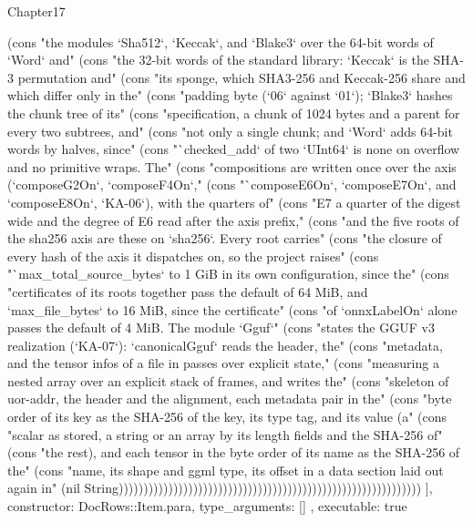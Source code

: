 \begin{lexlean}{Chapter17}
\begin{semanticmodule}
{{(cons "the modules `Sha512`, `Keccak`, and `Blake3` over the 64-bit words of `Word` and" (cons "the 32-bit words of the standard library: `Keccak` is the SHA-3 permutation and" (cons "its sponge, which SHA3-256 and Keccak-256 share and which differ only in the" (cons "padding byte (`06` against `01`); `Blake3` hashes the chunk tree of its" (cons "specification, a chunk of 1024 bytes and a parent for every two subtrees, and" (cons "not only a single chunk; and `Word` adds 64-bit words by halves, since" (cons "`checked_add` of two `UInt64` is none on overflow and no primitive wraps. The" (cons "compositions are written once over the axis (`composeG2On`, `composeF4On`," (cons "`composeE6On`, `composeE7On`, and `composeE8On`, `KA-06`), with the quarters of" (cons "E7 a quarter of the digest wide and the degree of E6 read after the axis prefix," (cons "and the five roots of the sha256 axis are these on `sha256`. Every root carries" (cons "the closure of every hash of the axis it dispatches on, so the project raises" (cons "`max_total_source_bytes` to 1 GiB in its own configuration, since the" (cons "certificates of its roots together pass the default of 64 MiB, and `max_file_bytes` to 16 MiB, since the certificate" (cons "of `onnxLabelOn` alone passes the default of 4 MiB. The module `Gguf`" (cons "states the GGUF v3 realization (`KA-07`): `canonicalGguf` reads the header, the" (cons "metadata, and the tensor infos of a file in passes over explicit state," (cons "measuring a nested array over an explicit stack of frames, and writes the" (cons "skeleton of uor-addr, the header and the alignment, each metadata pair in the" (cons "byte order of its key as the SHA-256 of the key, its type tag, and its value (a" (cons "scalar as stored, a string or an array by its length fields and the SHA-256 of" (cons "the rest), and each tensor in the byte order of its name as the SHA-256 of the" (cons "name, its shape and ggml type, its offset in a data section laid out again in" (nil String)))))))))))))))))))))))))))))))))))))))))))))))))))))))))))))
    ],
    constructor: DocRows::Item.para,
    type_arguments: []
  },
  executable: true
}


\end{semanticmodule}
\end{lexlean}
